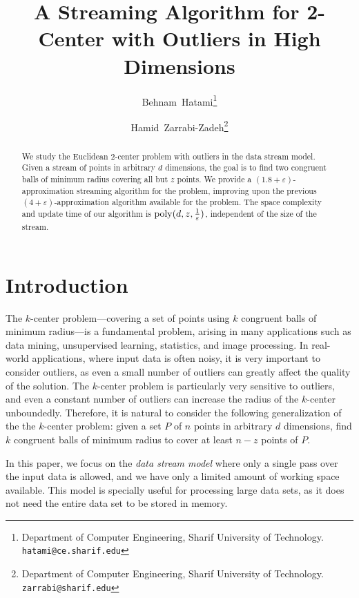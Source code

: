 \documentclass[envcountsame]{cls/cccg15}
\title{A Streaming Algorithm for 2-Center with Outliers in High Dimensions}
\author{Behnam~Hatami\thanks{Department of Computer Engineering, 
	Sharif University of Technology.
	{\tt hatami@ce.sharif.edu}}
	\and 
	Hamid~Zarrabi-Zadeh\thanks{Department of Computer Engineering, 
	Sharif University of Technology.
	{\tt zarrabi@sharif.edu}}
}
\newcommand{\poly}{\mathop{\mathrm{poly}}}
\newcommand{\eps}{\varepsilon}
\begin{document}
\maketitle
\pagestyle{plain}


\begin{abstract}
We study the Euclidean 2-center problem with outliers in the data stream model. 
Given a stream of points in arbitrary $d$ dimensions, the goal is to find two congruent balls 
of minimum radius covering all but $z$ points. 
We provide a $(1.8+\eps)$-approximation streaming algorithm for the problem, 
improving upon the previous $(4 + \eps)$-approximation algorithm available for the problem.
The space complexity and update time of our algorithm is $\poly(d, z, {1 \over \eps})$,
independent of the size of the stream.
\end{abstract}


\section{Introduction}
The $k$-center problem---covering a set of points 
using $k$ congruent balls of minimum radius---is a fundamental problem,
arising in many applications 
such as data mining, unsupervised learning, statistics, and image processing.
In real-world applications, where input data is often noisy, 
it is very important to consider outliers, 
as even a small number of outliers can greatly affect the quality of the solution.
The $k$-center problem is particularly very sensitive to outliers,
and even a constant number of outliers can increase the radius of the $k$-center unboundedly.
Therefore, it is natural to consider the following generalization of
the the $k$-center problem: %
given a set $P$ of $n$ points in arbitrary $d$ dimensions, 
find $k$ congruent balls of minimum radius 
to cover at least $n - z$ points of $P$.

In this paper, we focus on the \emph{data stream model}
where only a single pass over the input data is allowed,
and we have only a limited amount of working space available.
This model is specially useful for processing large data sets,
as it does not need the entire data set to be stored in memory.
\end{document}
